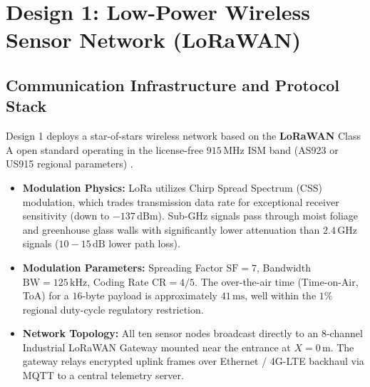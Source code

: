\documentclass[12pt]{article}
\begin{document}
\section{Design 1: Low-Power Wireless Sensor Network (LoRaWAN)}

\subsection{Communication Infrastructure and Protocol Stack}
Design 1 deploys a star-of-stars wireless network based on the \textbf{LoRaWAN} Class A open standard operating in the license-free $915\,\text{MHz}$ ISM band (AS923 or US915 regional parameters) \cite{lora_alliance}.
\begin{itemize}
    \item \textbf{Modulation Physics:} LoRa utilizes Chirp Spread Spectrum (CSS) modulation, which trades transmission data rate for exceptional receiver sensitivity (down to $-137\,\text{dBm}$). Sub-GHz signals pass through moist foliage and greenhouse glass walls with significantly lower attenuation than $2.4\,\text{GHz}$ signals ($10-15\,\text{dB}$ lower path loss).
    \item \textbf{Modulation Parameters:} Spreading Factor $\text{SF}=7$, Bandwidth $\text{BW}=125\,\text{kHz}$, Coding Rate $\text{CR}=4/5$. The over-the-air time (Time-on-Air, ToA) for a $16$-byte payload is approximately $41\,\text{ms}$, well within the $1\%$ regional duty-cycle regulatory restriction.
    \item \textbf{Network Topology:} All ten sensor nodes broadcast directly to an 8-channel Industrial LoRaWAN Gateway mounted near the entrance at $X=0\,\text{m}$. The gateway relays encrypted uplink frames over Ethernet / 4G-LTE backhaul via MQTT to a central telemetry server.
\end{itemize}
\end{document}
